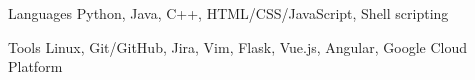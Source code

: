 
\begin{cvskills}
  \cvskill
    {Languages} %
    {Python, Java, C++, HTML/CSS/JavaScript, Shell scripting} %

  \cvskill
    {Tools}
    {Linux, Git/GitHub, Jira, Vim, Flask, Vue.js, Angular, Google Cloud Platform}
    
\end{cvskills}
